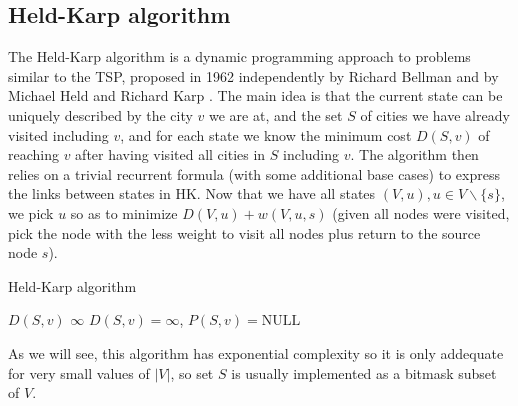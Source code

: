 \subsection{Held-Karp algorithm} \label{algorithm-tsp-heldkarp}
The Held-Karp algorithm is a \gls{dynamic programming} approach to problems similar to the \acrlong*{TSP}, proposed in 1962 independently by Richard Bellman \cite{bellman62} and by Michael Held and Richard Karp \cite{held-karp62}. The main idea is that the current state can be uniquely described by the city $v$ we are at, and the set $S$ of cities we have already visited including $v$, and for each state we know the minimum cost $D(S,v)$ of reaching $v$ after having visited all cities in $S$ including $v$. The algorithm then relies on a trivial recurrent formula (with some additional base cases) to express the links between states in \textsc{HK}. Now that we have all states $(V, u), u \in V \backslash \{s\}$, we pick $u$ so as to minimize $D(V, u)+w(V,u,s)$ (given all nodes were visited, pick the node with the less weight to visit all nodes plus return to the source node $s$).
\begin{algorithm}[H]
    \caption{Held-Karp algorithm}
    \label{alg:held-karp}
    \begin{algorithmic}[1]
             \Return $D(S,v)$
            \EndIf
             \Return $\infty$ 
            \EndIf
                  
                \Else             { \Return {$\infty$} } 
                \EndIf
            \EndIf
                     
                \EndIf
            \EndFor
            \State {}
        \EndFunction
             {$D(S,v)=\infty$, $P(S,v)=\text{NULL}$}
            \EndFor
                \EndIf
            \EndFor
            \Repeat 
            \State {}
        \EndFunction
    \end{algorithmic}
\end{algorithm}
As we will see, this algorithm has exponential complexity so it is only addequate for very small values of $|V|$, so set $S$ is usually implemented as a bitmask subset of $V$.
